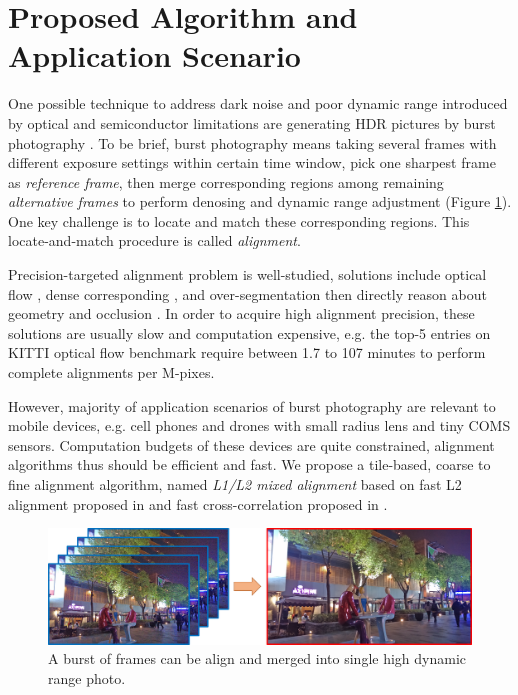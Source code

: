 \documentclass[conference, 10pt]{IEEEtran}
\makeatletter
\newcommand*{\eg}{e.g.\@\xspace}
\makeatother
\begin{document}
\section{Proposed Algorithm and Application Scenario}

One possible technique to address dark noise and poor dynamic range introduced by
optical and semiconductor limitations are generating HDR pictures by burst photography \cite{kayvon18visual, liu2014fast}.
To be brief, burst photography means taking several frames with different exposure settings
within certain time window, pick one sharpest frame as \emph{reference frame},
then merge corresponding regions among remaining \emph{alternative frames} to
perform denosing and dynamic range adjustment (Figure \ref{img::intro}). One key challenge is to locate and
match these corresponding regions. This locate-and-match procedure is called \emph{alignment}.

Precision-targeted alignment problem is well-studied, solutions include optical flow \cite{horn1981determining},
dense corresponding \cite{liu2011sift}, and over-segmentation then directly reason about geometry and occlusion
\cite{yamaguchi2014efficient}. In order to acquire high alignment precision, these solutions are usually slow and computation expensive,
\eg the top-5 entries on KITTI optical flow benchmark \cite{menze2015object} require between
1.7 to 107 minutes to perform complete alignments per M-pixes.

However, majority of application scenarios of burst photography are relevant to mobile devices, \eg
cell phones and drones with small radius lens and tiny COMS sensors. Computation budgets of these
devices are quite constrained, alignment algorithms thus should be efficient and fast.
We propose a tile-based, coarse to fine alignment algorithm, named \emph{L1/L2 mixed alignment}
based on fast L2 alignment proposed in \cite{hasinoff2016burst} and fast cross-correlation
proposed in \cite{yoo2009fast}.

\begin{figure}[tb]
\centering
\includegraphics[width=\columnwidth]{img/intro_Liu_SIGGRAPH14.png}
\caption{A burst of frames can be align and merged into single high dynamic range photo. \cite{liu2014fast}}
\label{img::intro}
\end{figure}
\end{document}
